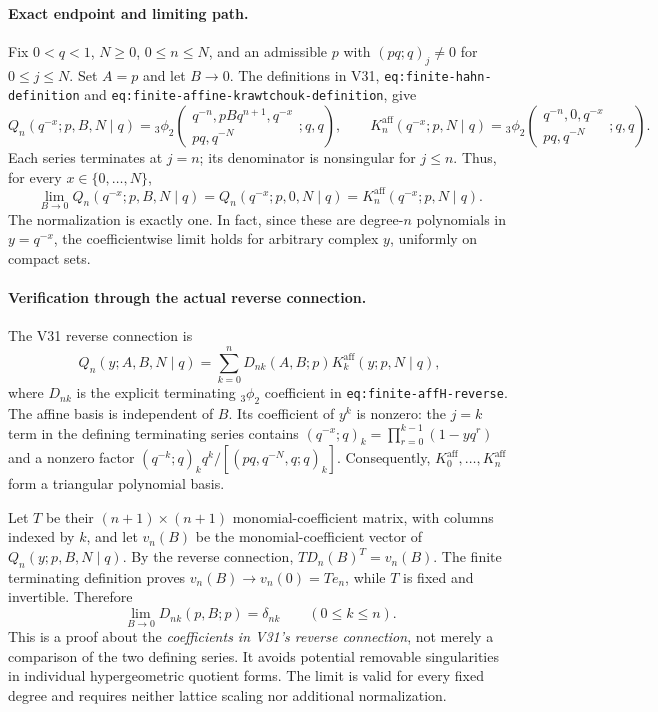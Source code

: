 \documentclass[11pt]{article}
\begin{document}
\paragraph{Exact endpoint and limiting path.} Fix $0<q<1$, $N\ge0$, $0\le n\le N$, and an admissible $p$ with $(pq;q)_j\ne0$ for $0\le j\le N$. Set $A=p$ and let $B\to0$. The definitions in V31, \texttt{eq:finite-hahn-definition} and \texttt{eq:finite-affine-krawtchouk-definition}, give
\[
 Q_n(q^{-x};p,B,N\mid q)
 ={}_3\phi_2\!\left(\begin{matrix}q^{-n},pBq^{n+1},q^{-x}\\pq,q^{-N}\end{matrix};q,q\right),
 \qquad
 K_n^{\mathrm{aff}}(q^{-x};p,N\mid q)
 ={}_3\phi_2\!\left(\begin{matrix}q^{-n},0,q^{-x}\\pq,q^{-N}\end{matrix};q,q\right).
\]
Each series terminates at $j=n$; its denominator is nonsingular for $j\le n$. Thus, for every $x\in\{0,\ldots,N\}$,
\begin{equation}\label{eq:v102-qh-aff}
 \boxed{\lim_{B\to0}Q_n(q^{-x};p,B,N\mid q)
 =Q_n(q^{-x};p,0,N\mid q)
 =K_n^{\mathrm{aff}}(q^{-x};p,N\mid q).}
\end{equation}
The normalization is exactly one. In fact, since these are degree-$n$ polynomials in $y=q^{-x}$, the coefficientwise limit holds for arbitrary complex $y$, uniformly on compact sets.

\paragraph{Verification through the actual reverse connection.} The V31 reverse connection is
\[
 Q_n(y;A,B,N\mid q)=\sum_{k=0}^n D_{nk}(A,B;p)K_k^{\mathrm{aff}}(y;p,N\mid q),
\]
where $D_{nk}$ is the explicit terminating ${}_3\phi_2$ coefficient in \texttt{eq:finite-affH-reverse}. The affine basis is independent of $B$. Its coefficient of $y^k$ is nonzero: the $j=k$ term in the defining terminating series contains $(q^{-x};q)_k=\prod_{r=0}^{k-1}(1-yq^r)$ and a nonzero factor $(q^{-k};q)_k q^k/[(pq,q^{-N},q;q)_k]$. Consequently, $K_0^{\mathrm{aff}},\ldots,K_n^{\mathrm{aff}}$ form a triangular polynomial basis.

Let $T$ be their $(n+1)\times(n+1)$ monomial-coefficient matrix, with columns indexed by $k$, and let $v_n(B)$ be the monomial-coefficient vector of $Q_n(y;p,B,N\mid q)$. By the reverse connection, $T D_n(B)^T=v_n(B)$. The finite terminating definition proves $v_n(B)\to v_n(0)=T e_n$, while $T$ is fixed and invertible. Therefore
\[
 \boxed{\lim_{B\to0}D_{nk}(p,B;p)=\delta_{nk}\qquad(0\le k\le n).}
\]
This is a proof about the \emph{coefficients in V31's reverse connection}, not merely a comparison of the two defining series. It avoids potential removable singularities in individual hypergeometric quotient forms. The limit is valid for every fixed degree and requires neither lattice scaling nor additional normalization.
\end{document}
